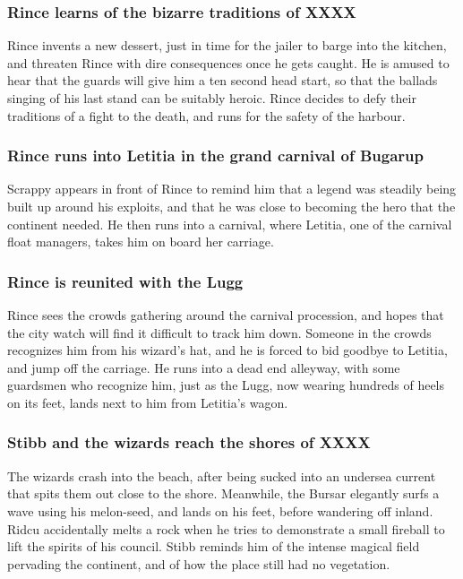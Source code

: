 \subsubsection{\Gls{Rince} learns of the bizarre traditions of XXXX}
\Gls{Rince} invents a new dessert, just in time for the jailer to barge into the kitchen, and
threaten \Gls{Rince} with dire consequences once he gets caught. He is amused to hear that the
guards will give him a ten second head start, so that the ballads singing of his last stand can be
suitably heroic. \Gls{Rince} decides to defy their traditions of a fight to the death, and runs for
the safety of the harbour.

\subsubsection{\Gls{Rince} runs into \Gls{Letitia} in the grand carnival of Bugarup}
\Gls{Scrappy} appears in front of \Gls{Rince} to remind him that a legend was steadily being
built up around his exploits, and that he was close to becoming the hero that the continent needed.
He then runs into a carnival, where \Gls{Letitia}, one of the carnival float managers, takes him
on board her carriage.

\subsubsection{\Gls{Rince} is reunited with the \Gls{Lugg}}
\Gls{Rince} sees the crowds gathering around the carnival procession, and hopes that the city
watch will find it difficult to track him down. Someone in the crowds recognizes him from his
wizard's hat, and he is forced to bid goodbye to \Gls{Letitia}, and jump off the carriage. He runs
into a dead end alleyway, with some guardsmen who recognize him, just as the \Gls{Lugg}, now wearing
hundreds of heels on its feet, lands next to him from \Gls{Letitia}'s wagon.

\subsubsection{\Gls{Stibb} and the wizards reach the shores of XXXX}
The wizards crash into the beach, after being sucked into an undersea current that spits them out
close to the shore. Meanwhile, the \Gls{Bursar} elegantly surfs a wave using his melon-seed, and
lands on his feet, before wandering off inland. \Gls{Ridcu} accidentally melts a rock when he tries
to demonstrate a small fireball to lift the spirits of his council. \Gls{Stibb} reminds him of the
intense magical field pervading the continent, and of how the place still had no vegetation.

